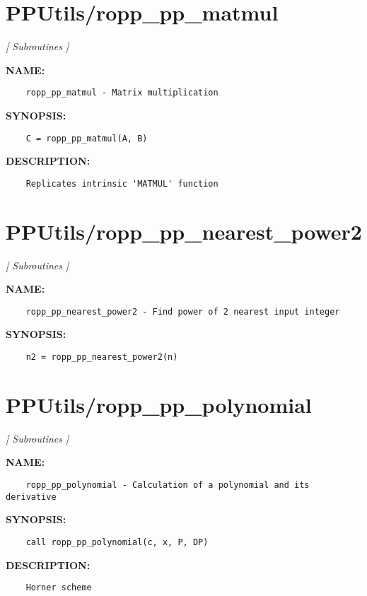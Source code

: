 \section{PPUtils/ropp\_pp\_matmul}
\textsl{[ Subroutines ]}

\label{ch:robo61}
\label{ch:PPUtils_ropp_pp_matmul}
\textbf{NAME:}\hspace{0.08in}\begin{Verbatim}
    ropp_pp_matmul - Matrix multiplication 
\end{Verbatim}
\textbf{SYNOPSIS:}\hspace{0.08in}\begin{Verbatim}
    C = ropp_pp_matmul(A, B)
\end{Verbatim}
\textbf{DESCRIPTION:}\hspace{0.08in}\begin{Verbatim}
    Replicates intrinsic 'MATMUL' function
\end{Verbatim}
\section{PPUtils/ropp\_pp\_nearest\_power2}
\textsl{[ Subroutines ]}

\label{ch:robo62}
\label{ch:PPUtils_ropp_pp_nearest_power2}
\textbf{NAME:}\hspace{0.08in}\begin{Verbatim}
    ropp_pp_nearest_power2 - Find power of 2 nearest input integer
\end{Verbatim}
\textbf{SYNOPSIS:}\hspace{0.08in}\begin{Verbatim}
    n2 = ropp_pp_nearest_power2(n)
\end{Verbatim}
\section{PPUtils/ropp\_pp\_polynomial}
\textsl{[ Subroutines ]}

\label{ch:robo63}
\label{ch:PPUtils_ropp_pp_polynomial}
\textbf{NAME:}\hspace{0.08in}\begin{Verbatim}
    ropp_pp_polynomial - Calculation of a polynomial and its derivative
\end{Verbatim}
\textbf{SYNOPSIS:}\hspace{0.08in}\begin{Verbatim}
    call ropp_pp_polynomial(c, x, P, DP)
\end{Verbatim}
\textbf{DESCRIPTION:}\hspace{0.08in}\begin{Verbatim}
    Horner scheme
\end{Verbatim}
